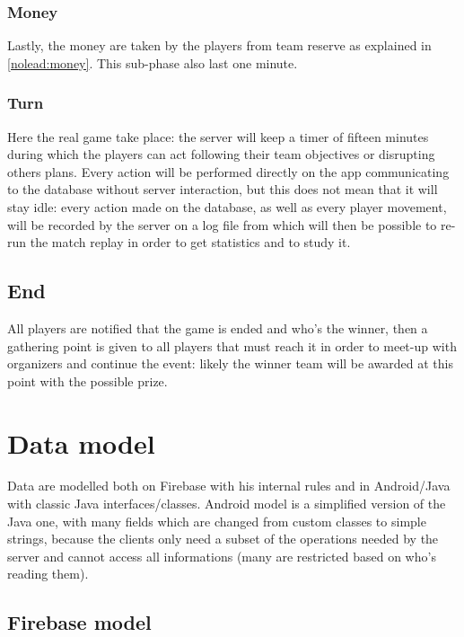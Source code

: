 			\subsubsection{Money}
				
				Lastly, the money are taken by the players from team reserve as explained in \autoref{nolead:money}.
				This sub-phase also last one minute.
							
			\subsubsection{Turn}
			
				Here the real game take place: the server will keep a timer of fifteen minutes during which the players can act following their team objectives or disrupting others plans.
				Every action will be performed directly on the app communicating to the database without server interaction, but this does not mean that it will stay idle: every action made on the database, as well as every player movement, will be recorded by the server on a log file from which will then be possible to re-run the match replay in order to get statistics and to study it.
			
		\subsection{End}
		
			All players are notified that the game is ended and who's the winner, then a gathering point is given to all players that must reach it in order to meet-up with organizers and continue the event: likely the winner team will be awarded at this point with the possible prize.
			
	\section{Data model}	
		
		Data are modelled both on Firebase with his internal rules and in Android/Java with classic Java interfaces/classes.
		Android model is a simplified version of the Java one, with many fields which are changed from custom classes to simple strings, because the clients only need a subset of the operations needed by the server and cannot access all informations (many are restricted based on who's reading them).
		
		\subsection{Firebase model}
			
